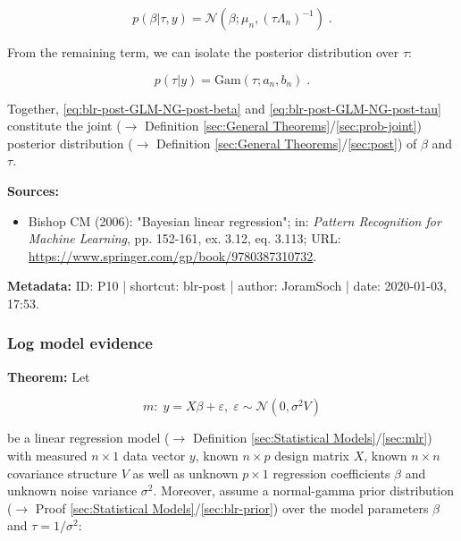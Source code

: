 \documentclass[a4paper,12pt,twoside]{book}
\begin{document}
\begin{equation} \label{eq:blr-post-GLM-NG-post-beta}
p(\beta|\tau,y) = \mathcal{N}(\beta; \mu_n, (\tau \Lambda_n)^{-1}) \; .
\end{equation}

From the remaining term, we can isolate the posterior distribution over $\tau$:

\begin{equation} \label{eq:blr-post-GLM-NG-post-tau}
p(\tau|y) = \mathrm{Gam}(\tau; a_n, b_n) \; .
\end{equation}

Together, \eqref{eq:blr-post-GLM-NG-post-beta} and \eqref{eq:blr-post-GLM-NG-post-tau} constitute the joint ($\rightarrow$ Definition \ref{sec:General Theorems}/\ref{sec:prob-joint}) posterior distribution ($\rightarrow$ Definition \ref{sec:General Theorems}/\ref{sec:post}) of $\beta$ and $\tau$.


\vspace{1em}
\textbf{Sources:}
\begin{itemize}
\item Bishop CM (2006): "Bayesian linear regression"; in: \textit{Pattern Recognition for Machine Learning}, pp. 152-161, ex. 3.12, eq. 3.113; URL: \url{https://www.springer.com/gp/book/9780387310732}.
\end{itemize}


\vspace{1em}
\textbf{Metadata:} ID: P10 | shortcut: blr-post | author: JoramSoch | date: 2020-01-03, 17:53.
\vspace{1em}



\subsubsection[\textbf{Log model evidence}]{Log model evidence} \label{sec:blr-lme}
\setcounter{equation}{0}

\textbf{Theorem:} Let

\begin{equation} \label{eq:blr-lme-GLM}
m: \; y = X \beta + \varepsilon, \; \varepsilon \sim \mathcal{N}(0, \sigma^2 V)
\end{equation}

be a linear regression model ($\rightarrow$ Definition \ref{sec:Statistical Models}/\ref{sec:mlr}) with measured $n \times 1$ data vector $y$, known $n \times p$ design matrix $X$, known $n \times n$ covariance structure $V$ as well as unknown $p \times 1$ regression coefficients $\beta$ and unknown noise variance $\sigma^2$. Moreover, assume a normal-gamma prior distribution ($\rightarrow$ Proof \ref{sec:Statistical Models}/\ref{sec:blr-prior}) over the model parameters $\beta$ and $\tau = 1/\sigma^2$:
\end{document}
